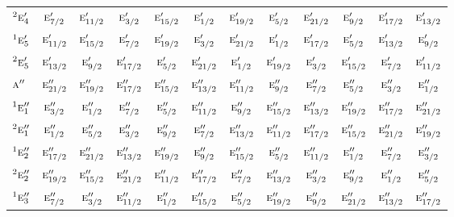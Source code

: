 \documentclass[10pt,a4paper]{article}
\numberwithin{equation}{section}
\newcommand{\irr}[1]{\text{\normalfont\scshape #1}}
\newcommand{\conjpair}[1]{{}^{#1}}
\begin{document}
{\begin{longtable}{@{}lccccccccccc@{}}
$\conjpair{2}\irr{e}_{4}'$ & $\irr{e}_{7/2}'$ & $\irr{e}_{11/2}'$ & $\irr{e}_{3/2}'$ & $\irr{e}_{15/2}'$ & $\irr{e}_{1/2}'$ & $\irr{e}_{19/2}'$ & $\irr{e}_{5/2}'$ & $\irr{e}_{21/2}'$ & $\irr{e}_{9/2}'$ & $\irr{e}_{17/2}'$ & $\irr{e}_{13/2}'$\\
$\conjpair{1}\irr{e}_{5}'$ & $\irr{e}_{11/2}'$ & $\irr{e}_{15/2}'$ & $\irr{e}_{7/2}'$ & $\irr{e}_{19/2}'$ & $\irr{e}_{3/2}'$ & $\irr{e}_{21/2}'$ & $\irr{e}_{1/2}'$ & $\irr{e}_{17/2}'$ & $\irr{e}_{5/2}'$ & $\irr{e}_{13/2}'$ & $\irr{e}_{9/2}'$\\
$\conjpair{2}\irr{e}_{5}'$ & $\irr{e}_{13/2}'$ & $\irr{e}_{9/2}'$ & $\irr{e}_{17/2}'$ & $\irr{e}_{5/2}'$ & $\irr{e}_{21/2}'$ & $\irr{e}_{1/2}'$ & $\irr{e}_{19/2}'$ & $\irr{e}_{3/2}'$ & $\irr{e}_{15/2}'$ & $\irr{e}_{7/2}'$ & $\irr{e}_{11/2}'$\\
$\irr{a}''$ & $\irr{e}_{21/2}''$ & $\irr{e}_{19/2}''$ & $\irr{e}_{17/2}''$ & $\irr{e}_{15/2}''$ & $\irr{e}_{13/2}''$ & $\irr{e}_{11/2}''$ & $\irr{e}_{9/2}''$ & $\irr{e}_{7/2}''$ & $\irr{e}_{5/2}''$ & $\irr{e}_{3/2}''$ & $\irr{e}_{1/2}''$\\
$\conjpair{1}\irr{e}_{1}''$ & $\irr{e}_{3/2}''$ & $\irr{e}_{1/2}''$ & $\irr{e}_{7/2}''$ & $\irr{e}_{5/2}''$ & $\irr{e}_{11/2}''$ & $\irr{e}_{9/2}''$ & $\irr{e}_{15/2}''$ & $\irr{e}_{13/2}''$ & $\irr{e}_{19/2}''$ & $\irr{e}_{17/2}''$ & $\irr{e}_{21/2}''$\\
$\conjpair{2}\irr{e}_{1}''$ & $\irr{e}_{1/2}''$ & $\irr{e}_{5/2}''$ & $\irr{e}_{3/2}''$ & $\irr{e}_{9/2}''$ & $\irr{e}_{7/2}''$ & $\irr{e}_{13/2}''$ & $\irr{e}_{11/2}''$ & $\irr{e}_{17/2}''$ & $\irr{e}_{15/2}''$ & $\irr{e}_{21/2}''$ & $\irr{e}_{19/2}''$\\
$\conjpair{1}\irr{e}_{2}''$ & $\irr{e}_{17/2}''$ & $\irr{e}_{21/2}''$ & $\irr{e}_{13/2}''$ & $\irr{e}_{19/2}''$ & $\irr{e}_{9/2}''$ & $\irr{e}_{15/2}''$ & $\irr{e}_{5/2}''$ & $\irr{e}_{11/2}''$ & $\irr{e}_{1/2}''$ & $\irr{e}_{7/2}''$ & $\irr{e}_{3/2}''$\\
$\conjpair{2}\irr{e}_{2}''$ & $\irr{e}_{19/2}''$ & $\irr{e}_{15/2}''$ & $\irr{e}_{21/2}''$ & $\irr{e}_{11/2}''$ & $\irr{e}_{17/2}''$ & $\irr{e}_{7/2}''$ & $\irr{e}_{13/2}''$ & $\irr{e}_{3/2}''$ & $\irr{e}_{9/2}''$ & $\irr{e}_{1/2}''$ & $\irr{e}_{5/2}''$\\
$\conjpair{1}\irr{e}_{3}''$ & $\irr{e}_{7/2}''$ & $\irr{e}_{3/2}''$ & $\irr{e}_{11/2}''$ & $\irr{e}_{1/2}''$ & $\irr{e}_{15/2}''$ & $\irr{e}_{5/2}''$ & $\irr{e}_{19/2}''$ & $\irr{e}_{9/2}''$ & $\irr{e}_{21/2}''$ & $\irr{e}_{13/2}''$ & $\irr{e}_{17/2}''$\\

\end{longtable}}
\end{document}
